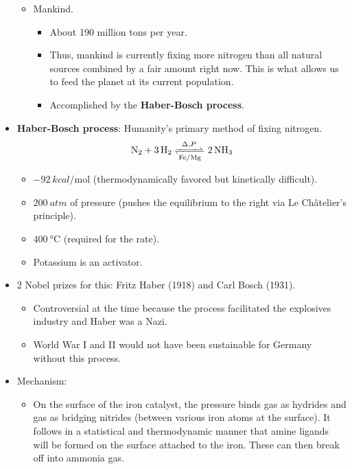 \documentclass[../notes.tex]{subfiles}
\begin{document}
\begin{itemize}
\begin{itemize}
        \item Mankind.
        \begin{itemize}
            \item About 190 million tons per year.
            \item Thus, mankind is currently fixing more nitrogen than all natural sources combined by a fair amount right now. This is what allows us to feed the planet at its current population.
            \item Accomplished by the \textbf{Haber-Bosch process}.
        \end{itemize}
    \end{itemize}
    \item \textbf{Haber-Bosch process}: Humanity's primary method of fixing nitrogen.
    \begin{equation*}
        \ce{N2 + 3H2 <=>[$\Delta, P$][Fe/Mg] 2NH3}
    \end{equation*}
    \begin{itemize}
        \item $-\SI{92}{kcal\per\mole}$ (thermodynamically favored but kinetically difficult).
        \item $\SI{200}{atm}$ of pressure (pushes the equilibrium to the right via Le Ch\^{a}telier's principle).
        \item $\SI{400}{\celsius}$ (required for the rate).
        \item Potassium is an activator.
    \end{itemize}
    \item 2 Nobel prizes for this: Fritz Haber (1918) and Carl Bosch (1931).
    \begin{itemize}
        \item Controversial at the time because the process facilitated the explosives industry and Haber was a Nazi.
        \item World War I and II would not have been sustainable for Germany without this process.
    \end{itemize}
    \item Mechanism:
    \begin{itemize}
        \item On the surface of the iron catalyst, the pressure binds  gas as hydrides and  gas as bridging nitrides (between various iron atoms at the surface). It follows in a statistical and thermodynamic manner that amine ligands will be formed on the surface attached to the iron. These can then break off into ammonia gas.

\end{itemize}
\end{itemize}
\end{document}
